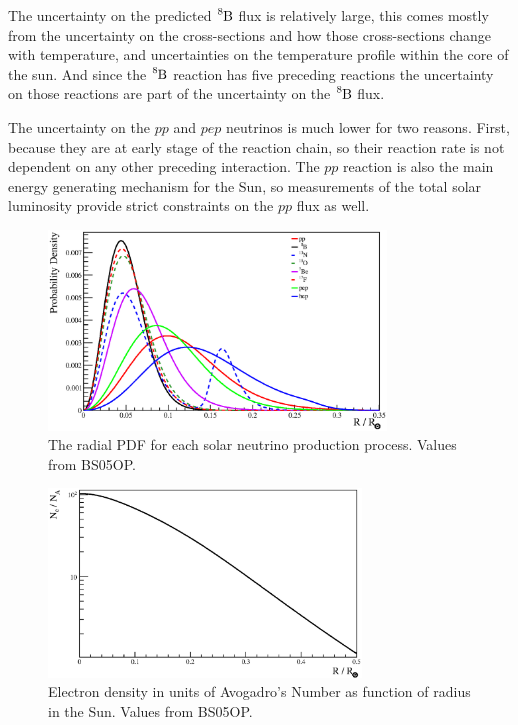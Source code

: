 The uncertainty on the predicted $\ce{^{8}B}$ flux is relatively large, this comes mostly
from the uncertainty on the cross-sections and how those cross-sections change with
temperature, and uncertainties on the temperature profile within the core of the sun.
And since the $\ce{^{8}B}$ reaction has five preceding reactions the uncertainty on
 those reactions are part of the uncertainty on the $\ce{^{8}B}$ flux.

The uncertainty on the $pp$ and $pep$ neutrinos is much lower for two reasons. First, because
they are at early stage of the reaction chain, so their reaction rate is not dependent on any
other preceding interaction. The $pp$ reaction is also the main energy generating mechanism
for the Sun, so measurements of the total solar luminosity provide strict constraints on the
$pp$ flux as well.

\begin{figure}[htbp]
\centering
\includegraphics[width=0.8\textwidth]{solar_radial_production}
\caption[BS05OP Radial Production Profiles]{The radial
PDF for each solar neutrino production process. Values from BS05OP.}
\label{fig:radial_production_pdfs}
\end{figure}

\begin{figure}[htbp]
\centering
\includegraphics[width=0.74\textwidth]{solar_electron_density}
\caption[BS05OP Electron Density]{Electron density in units of Avogadro's
Number as function of radius in the Sun. Values from BS05OP.}
\label{fig:electron_density}
\end{figure}

